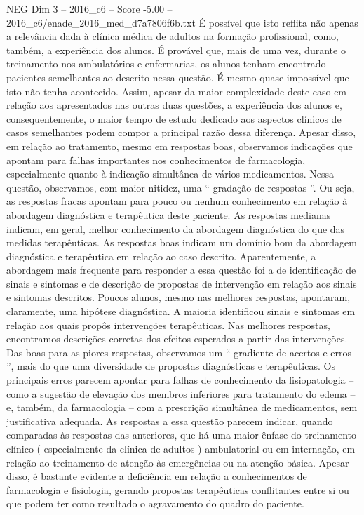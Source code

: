 \begin{textsample}{NEG Dim 3 – 2016\_c6 – Score -5.00 – 2016\_c6/enade\_2016\_med\_d7a7806f6b.txt}
É possível que isto reflita não apenas a relevância dada à clínica médica de adultos na formação profissional, como, também, a experiência dos alunos.
É provável que, mais de uma vez, durante o treinamento nos ambulatórios e enfermarias, os alunos tenham encontrado pacientes semelhantes ao descrito nessa questão.
É mesmo quase impossível que isto não tenha acontecido.
Assim, apesar da maior complexidade deste caso em relação aos apresentados nas outras duas questões, a experiência dos alunos e, consequentemente, o maior tempo de estudo dedicado aos aspectos clínicos de casos semelhantes podem compor a principal razão dessa diferença.
Apesar disso, em relação ao tratamento, mesmo em respostas boas, observamos indicações que apontam para falhas importantes nos conhecimentos de farmacologia, especialmente quanto à indicação simultânea de vários medicamentos.
Nessa questão, observamos, com maior nitidez, uma “ gradação de respostas ”.
Ou seja, as respostas fracas apontam para pouco ou nenhum conhecimento em relação à abordagem diagnóstica e terapêutica deste paciente.
As respostas medianas indicam, em geral, melhor conhecimento da abordagem diagnóstica do que das medidas terapêuticas.
As respostas boas indicam um domínio bom da abordagem diagnóstica e terapêutica em relação ao caso descrito.
Aparentemente, a abordagem mais frequente para responder a essa questão foi a de identificação de sinais e sintomas e de descrição de propostas de intervenção em relação aos sinais e sintomas descritos.
Poucos alunos, mesmo nas melhores respostas, apontaram, claramente, uma hipótese diagnóstica.
A maioria identificou sinais e sintomas em relação aos quais propôs intervenções terapêuticas.
Nas melhores respostas, encontramos descrições corretas dos efeitos esperados a partir das intervenções.
Das boas para as piores respostas, observamos um “ gradiente de acertos e erros ”, mais do que uma diversidade de propostas diagnósticas e terapêuticas.
Os principais erros parecem apontar para falhas de conhecimento da fisiopatologia – como a sugestão de elevação dos membros inferiores para tratamento do edema – e, também, da farmacologia – com a prescrição simultânea de medicamentos, sem justificativa adequada.
As respostas a essa questão parecem indicar, quando comparadas às respostas das anteriores, que há uma maior ênfase do treinamento clínico ( especialmente da clínica de adultos ) ambulatorial ou em internação, em relação ao treinamento de atenção às emergências ou na atenção básica.
Apesar disso, é bastante evidente a deficiência em relação a conhecimentos de farmacologia e fisiologia, gerando propostas terapêuticas conflitantes entre si ou que podem ter como resultado o agravamento do quadro do paciente.

\end{textsample}
